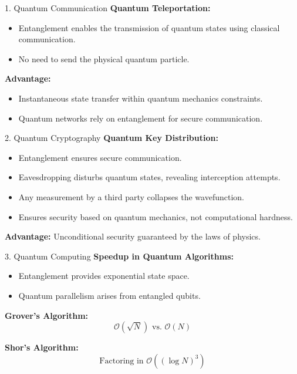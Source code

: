 \documentclass{beamer}
\begin{document}
\begin{frame}{1. Quantum Communication}
\textbf{Quantum Teleportation:}
\begin{itemize}
    \item Entanglement enables the transmission of quantum states using classical communication.
    \item No need to send the physical quantum particle.
\end{itemize}

\textbf{Advantage:}
\begin{itemize}
\item Instantaneous state transfer within quantum mechanics constraints.
\item Quantum networks rely on entanglement for secure communication.
  \end{itemize}
\end{frame}

\begin{frame}{2. Quantum Cryptography}
\textbf{Quantum Key Distribution:}
\begin{itemize}
    \item Entanglement ensures secure communication.
    \item Eavesdropping disturbs quantum states, revealing interception attempts.
\end{itemize}

\begin{itemize}
\item Any measurement by a third party collapses the wavefunction.  
\item Ensures security based on quantum mechanics, not computational hardness.
\end{itemize}
\textbf{Advantage:} Unconditional security guaranteed by the laws of physics.
\end{frame}

\begin{frame}{3. Quantum Computing}
\textbf{Speedup in Quantum Algorithms:}
\begin{itemize}
    \item Entanglement provides exponential state space.
    \item Quantum parallelism arises from entangled qubits.
\end{itemize}

\textbf{Grover's Algorithm:}
\[
\mathcal{O}(\sqrt{N}) \text{ vs. } \mathcal{O}(N)
\]

\textbf{Shor's Algorithm:}
\[
\text{Factoring in } \mathcal{O}((\log N)^3)
\]
\end{frame}
\end{document}
